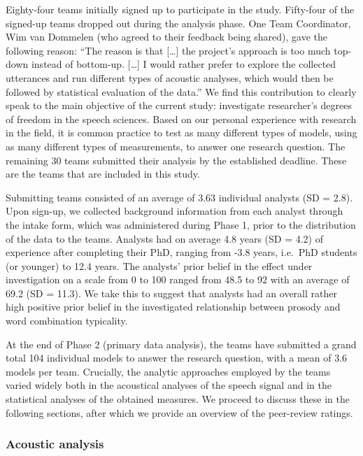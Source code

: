 \documentclass[Review,times,sageh]{sagej}
\begin{document}
Eighty-four teams initially signed up to participate in the study.
Fifty-four of the signed-up teams dropped out during the analysis phase.
One Team Coordinator, Wim van Dommelen (who agreed to their feedback being shared), gave the following reason: ``The reason is that {[}\ldots{]} the project's approach is too much top-down instead of bottom-up. {[}\ldots{]} I would rather prefer to explore the collected utterances and run different types of acoustic analyses, which would then be followed by statistical evaluation of the data.''
We find this contribution to clearly speak to the main objective of the current study: investigate researcher's degrees of freedom in the speech sciences.
Based on our personal experience with research in the field, it is common practice to test as many different types of models, using as many different types of measurements, to answer one research question.
The remaining 30 teams submitted their analysis by the established deadline.
These are the teams that are included in this study.

Submitting teams consisted of an average of 3.63 individual analysts (SD = 2.8).
Upon sign-up, we collected background information from each analyst through the intake form, which was administered during Phase 1, prior to the distribution of the data to the teams.
Analysts had on average 4.8 years (SD = 4.2) of experience after completing their PhD, ranging from -3.8 years, i.e.~PhD students (or younger) to 12.4 years.
The analysts' prior belief in the effect under investigation on a scale from 0 to 100 ranged from 48.5 to 92 with an average of 69.2 (SD = 11.3).
We take this to suggest that analysts had an overall rather high positive prior belief in the investigated relationship between prosody and word combination typicality.

At the end of Phase 2 (primary data analysis), the teams have submitted a grand total 104 individual models to answer the research question, with a mean of 3.6 models per team.
Crucially, the analytic approaches employed by the teams varied widely both in the acoustical analyses of the speech signal and in the statistical analyses of the obtained measures.
We proceed to discuss these in the following sections, after which we provide an overview of the peer-review ratings.

\hypertarget{acoustic-analysis}{%
\subsubsection{Acoustic analysis}\label{acoustic-analysis}}
\end{document}
